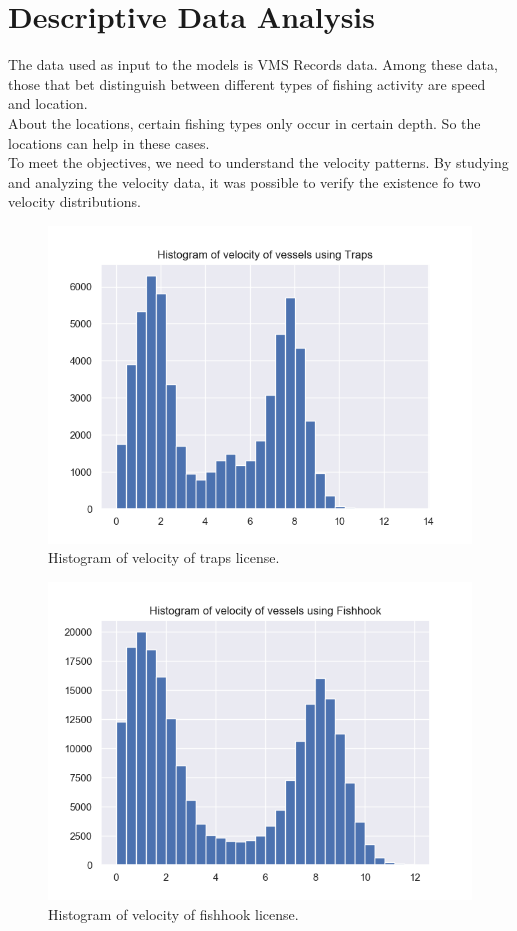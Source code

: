 

\section{Descriptive Data Analysis} %
\label{sub:data_analysis}



The data used as input to the models is VMS Records data. Among these data, those that bet distinguish between different types of fishing activity are speed and location.\\
About the locations, certain fishing types only occur in certain depth. So the locations can help in these cases. \\
To meet the objectives, we need to understand the velocity patterns.
By studying and analyzing the velocity data, it was possible to verify the existence fo two velocity distributions.

\begin{figure}[h]
\centering
\includegraphics[width=0.8\linewidth]{Chapters/img/h_armadilhas.png}
\caption{Histogram of velocity of traps license.}
\label{fig:h_armadilhas}
\end{figure}


\begin{figure}[h]
\centering
\includegraphics[width=0.8\linewidth]{Chapters/img/h_linha.png}
\caption{Histogram of velocity of fishhook license.}
\label{fig:h_linha}
\end{figure}

